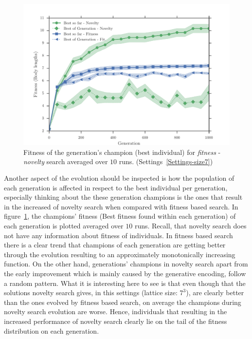 \begin{figure}[t!]
\centering
\includegraphics[width=1.0\textwidth]{../Figures/Results/AvgGenerChampNoveltyFitnessSize7.pdf}
\caption{Fitness of the generation's champion (best individual) for \emph{fitness} - \emph{novelty} search averaged over $10$ runs. (Settings~\ref{Settings-size7})}
\label{fig:AvgGenerChampNoveltyFitnessSize7}
\end{figure}

Another aspect of the evolution should be inspected is how the population of each generation is affected in respect to the best individual per generation, especially thinking about the these generation champions is the ones that result in the increased of novelty search when compared with fitness based search. In figure~\ref{fig:AvgGenerChampNoveltyFitnessSize7}, the champions' fitness (Best fitness found within each generation) of each generation is plotted averaged over $10$ runs. Recall, that novelty search does not have any information about fitness of individuals. In fitness based search there is a clear trend that champions of each generation are getting better through the evolution resulting to an approximately monotonically increasing function. On the other hand, generations' champions in novelty search apart from the early improvement which is mainly caused by the generative encoding, follow a random pattern. What it is interesting here to see is that even though that the solutions novelty search gives, in this settings (lattice size: $7^3$), are clearly better than the ones evolved by fitness based search, on average the champions during novelty search evolution are worse. Hence, individuals that resulting in the increased performance of novelty search clearly lie on the tail of the fitness distribution on each generation.


